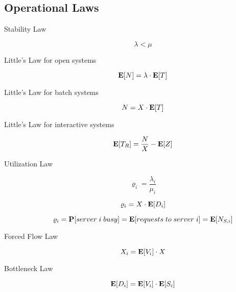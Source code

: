 \subsection{Operational Laws}

\begin{description}
	
	\item [Stability Law]	
		\begin{equation}
		\lambda < \mu
		\end{equation}
	
	\item [Little's Law for open systems]	
		\begin{equation}
		\mathbf{E}[N] = \lambda \cdot \mathbf{E}[T]
		\end{equation}
	
	\item [Little's Law for batch systems]	
		\begin{equation}
		N = X \cdot \mathbf{E}[T]
		\end{equation}
	
	\item [Little's Law for interactive systems]	
		\begin{equation}
		\mathbf{E}[T_{R}] = \frac{N}{X} - \mathbf{E}[Z]
		\end{equation}
	
	\item [Utilization Law]	
		\begin{equation}
		\varrho_{i} = \frac{\lambda_{i}}{\mu_{i}}
		\end{equation}
	
		\begin{equation}
		\varrho_{i} = X \cdot \mathbf{E}[D_{i}]
		\end{equation}
	
		\begin{equation}
		\varrho_{i} = \mathbf{P}[server \; i \; busy] = \mathbf{E}[requests \; to \; server \; i] = \mathbf{E}[N_{S,i}]
		\end{equation}
	
	\item [Forced Flow Law]		
		\begin{equation}
		X_{i} = \mathbf{E}[V_{i}] \cdot X
		\end{equation}
	
	\item [Bottleneck Law]	
		\begin{equation}
		\mathbf{E}[D_{i}] = \mathbf{E}[V_{i}] \cdot \mathbf{E}[S_{i}]
		\end{equation}
	
\end{description}




